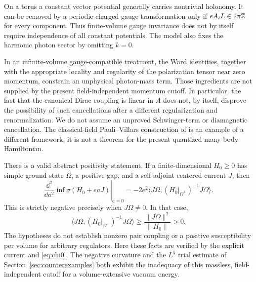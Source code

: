 \begin{remark}
\label{rem:ward}
On a torus a constant vector potential generally carries nontrivial
holonomy. It can be removed by a periodic charged gauge transformation only
if \(eA_iL\in2\pi\mathbb Z\) for every component. Thus finite-volume gauge
invariance does not by itself require independence of all constant
potentials. The model also fixes the harmonic photon sector by omitting
\(k=0\).

In an infinite-volume gauge-compatible treatment, the Ward identities,
together with the appropriate locality and regularity of the polarization
tensor near zero momentum, constrain an unphysical photon-mass term.
Those ingredients are not supplied by the present field-independent
momentum cutoff. In particular, the fact that the canonical Dirac coupling
is linear in \(A\) does not, by itself, disprove the possibility of such
cancellations after a different regularization and renormalization.
We do not assume an unproved Schwinger-term or diamagnetic cancellation.
The classical-field Pauli--Villars construction of \cite{GHLS2013} is an
example of a different framework; it is not a theorem for the present
quantized many-body Hamiltonian.

There is a valid abstract positivity statement. If a finite-dimensional
\(H_0\geq0\) has simple ground state \(\Omega\), a positive gap, and a
self-adjoint centered current \(J\), then
\[
 \left.\frac{\dd^2}{\dd a^2}\inf\sigma(H_0+eaJ)\right|_{a=0}
 =-2e^2\langle J\Omega,(H_0|_{\Omega^\perp})^{-1}J\Omega\rangle.
\]
This is strictly negative precisely when \(J\Omega\ne0\). In that case,
\[
 \langle J\Omega,(H_0|_{\Omega^\perp})^{-1}J\Omega\rangle
 \geq\frac{\|J\Omega\|^2}{\|H_0\|}>0.
\]
The hypotheses do not establish nonzero pair coupling or a positive
susceptibility per volume for arbitrary regulators. Here these facts are
verified by the explicit current and \eqref{eq:chi0}. The negative curvature
and the \(L^5\) trial estimate of Section~\ref{sec:counterexamples} both
exhibit the inadequacy of this massless, field-independent cutoff for a
volume-extensive vacuum energy.
\end{remark}

